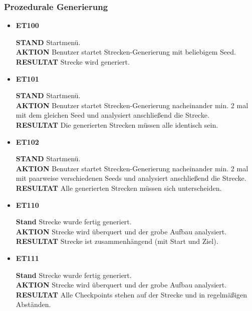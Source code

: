 \documentclass[parskip=full]{scrartcl}
\begin{document}
	\subsubsection{Prozedurale Generierung}
	\begin{itemize} [label={}]
		\item \textbf{ET100}\par
			\textbf{STAND} Startmenü.\\ 
			\textbf{AKTION} Benutzer startet Strecken-Generierung mit beliebigem \gls{Seed}.\\
			\textbf{RESULTAT} Strecke wird generiert.\\\par
		
		\item \textbf{ET101}\par
			\textbf{STAND} Startmenü.\\ 
			\textbf{AKTION} Benutzer startet Strecken-Generierung nacheinander min. 2 mal mit dem gleichen \gls{Seed} und analysiert anschließend die Strecke.\\
			\textbf{RESULTAT} Die generierten Strecken müssen alle identisch sein.\\\par
			
		\item \textbf{ET102}\par
			\textbf{STAND} Startmenü.\\ 
			\textbf{AKTION} Benutzer startet Strecken-Generierung nacheinander min. 2 mal mit paarweise verschiedenen \glspl{Seed} und analysiert anschließend die Strecke.\\
			\textbf{RESULTAT} Alle generierten Strecken müssen sich unterscheiden.\\\par
		
		\item \textbf{ET110}\par
			\textbf{Stand} Strecke wurde fertig generiert.\\
			\textbf{AKTION} Strecke wird überquert und der grobe Aufbau analysiert.\\
			\textbf{RESULTAT} Strecke ist zusammenhängend (mit Start und Ziel).\\\par
			
		\item \textbf{ET111}\par
			\textbf{Stand} Strecke wurde fertig generiert.\\
			\textbf{AKTION} Strecke wird überquert und der grobe Aufbau analysiert.\\
			\textbf{RESULTAT} Alle Checkpoints stehen auf der Strecke und in regelmäßigen Abständen.\\\par
			

\end{itemize}
\end{document}
